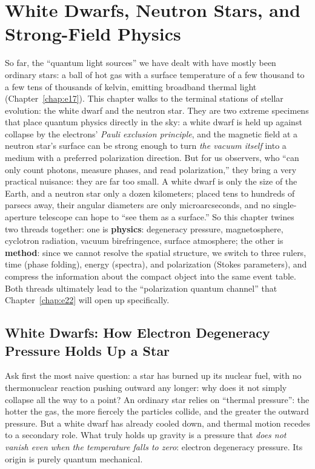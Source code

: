 \chapter{White Dwarfs, Neutron Stars, and Strong-Field Physics}
\label{chap:e18}

\begin{chapteropening}
So far, the ``quantum light sources'' we have dealt with have mostly been ordinary stars: a ball of hot gas with a surface temperature of a few thousand to a few tens of thousands of kelvin, emitting broadband thermal light (Chapter~\ref{chap:e17}). This chapter walks to the terminal stations of stellar evolution: the white dwarf and the neutron star. They are two extreme specimens that place quantum physics directly in the sky: a white dwarf is held up against collapse by the electrons' \emph{Pauli exclusion principle}, and the magnetic field at a neutron star's surface can be strong enough to turn \emph{the vacuum itself} into a medium with a preferred polarization direction. But for us observers, who ``can only count photons, measure phases, and read polarization,'' they bring a very practical nuisance: they are far too small. A white dwarf is only the size of the Earth, and a neutron star only a dozen kilometers; placed tens to hundreds of parsecs away, their angular diameters are only microarcseconds, and no single-aperture telescope can hope to ``see them as a surface.'' So this chapter twines two threads together: one is \textbf{physics}: degeneracy pressure, magnetosphere, cyclotron radiation, vacuum birefringence, surface atmosphere; the other is \textbf{method}: since we cannot resolve the spatial structure, we switch to three rulers, time (phase folding), energy (spectra), and polarization (Stokes parameters), and compress the information about the compact object into the same event table. Both threads ultimately lead to the ``polarization quantum channel'' that Chapter~\ref{chap:e22} will open up specifically.
\end{chapteropening}


\section{White Dwarfs: How Electron Degeneracy Pressure Holds Up a Star}
\label{sec:e18-degeneracy}

Ask first the most naive question: a star has burned up its nuclear fuel, with no thermonuclear reaction pushing outward any longer: why does it not simply collapse all the way to a point? An ordinary star relies on ``thermal pressure'': the hotter the gas, the more fiercely the particles collide, and the greater the outward pressure. But a white dwarf has already cooled down, and thermal motion recedes to a secondary role. What truly holds up gravity is a pressure that \emph{does not vanish even when the temperature falls to zero}: electron degeneracy pressure. Its origin is purely quantum mechanical.

